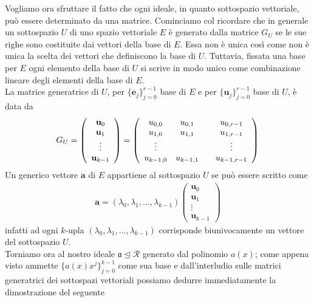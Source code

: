 Vogliamo ora sfruttare il fatto che ogni ideale, in quanto sottospazio vettoriale, può essere determinato da una matrice. Cominciamo col ricordare che in generale un sottospazio $U$ di uno spazio vettoriale $E$ è generato dalla matrice $G_{U}$ se le sue righe sono costituite dai vettori della base di $E$. Essa non è unica così come non è unica la scelta dei vettori che definiscono la base di $U$. Tuttavia, fissata una base per $E$ ogni elemento della base di $U$ si scrive in modo unico come combinazione lineare degli elementi della base di $E$.\\
La matrice generatrice di $U$, per $\lbrace \mathbf{e}_{j} \rbrace_{j=0}^{r-1}$ base di $E$ e per $\lbrace \mathbf{u}_{j} \rbrace_{j=0}^{r-1}$ base di $U$, è data da 
\begin{align*}
G_{U}
=  
\left(
\begin{array} {c}
  \mathbf{u}_{0} \\
  \mathbf{u}_{1} \\
  \vdots \\
  \mathbf{u}_{k-1}
\end{array}
\right)
= 
\left(
\begin{array} {c c c c}
u_{0,0} & u_{0,1} & & u_{0,r-1}  \\
u_{1,0} & u_{1,1} & & u_{1,r-1}  \\
\vdots &  & & \vdots  \\
u_{k-1,0} & u_{k-1,1} & & u_{k-1,r-1}  
\end{array}
\right)
\end{align*}
Un generico vettore $\mathbf{a}$ di $E$ appartiene al sottospazio $U$ se può essere scritto come 
\begin{align*}
\mathbf{a}
=
(\lambda_{0}, \lambda_{1}, \dots , \lambda_{k-1})
\left(
\begin{array} {c}
  \mathbf{u}_{0} \\
  \mathbf{u}_{1} \\
  \vdots \\
  \mathbf{u}_{k-1}
\end{array}
\right)
\end{align*}
infatti ad ogni $k$-upla $(\lambda_{0}, \lambda_{1}, \dots , \lambda_{k-1})$ corrisponde biunivocamente un vettore del sottospazio $U$.
\\
Torniamo ora al nostro ideale $\mathfrak{a} \unlhd \mathcal{R}$ generato dal polinomio $a(x)$; come appena visto ammette $\lbrace a(x)x^{j} \rbrace_{j=0}^{k-1}$ come sua base e dall'interludio sulle matrici generatrici dei sottospazi vettoriali possiamo dedurre immediatamente la dimostrazione del seguente
